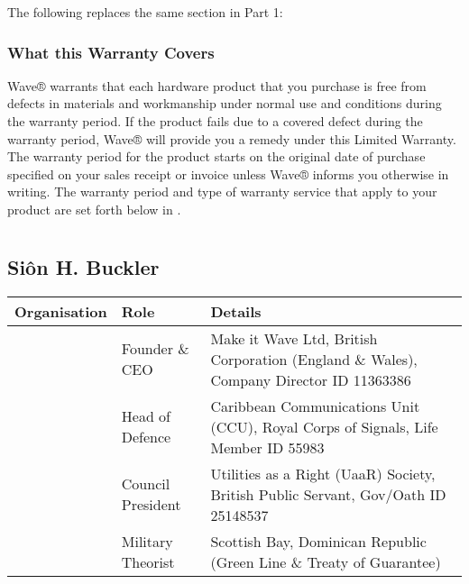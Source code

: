 \documentclass[letterpaper,10pt,openany,oneside,english]{sphinxmanual}
\begin{document}
The following replaces the same section in Part 1:


\subsection{What this Warranty Covers}
\label{\detokenize{part3:what-this-warranty-covers}}
Wave® warrants that each hardware product that you purchase is free from defects in materials and workmanship under normal use and conditions during the warranty period. If the product fails due to a covered defect during the warranty period, Wave® will provide you a remedy under this Limited Warranty. The warranty period for the product starts on the original date of purchase specified on your sales receipt or invoice unless Wave® informs you otherwise in writing. The warranty period and type of warranty service that apply to your product are set forth below in .


\chapter{}
\label{\detokenize{index:document-author-s}}

\section{Siôn H. Buckler}
\label{\detokenize{index:sion-h-buckler}}

\begin{savenotes}\sphinxattablestart
\centering
\begin{tabulary}{\linewidth}[t]{|T|T|T|}
\hline
\sphinxstyletheadfamily 
Organisation
&\sphinxstyletheadfamily 
Role
&\sphinxstyletheadfamily 
Details
\\
\hline
\noindent{}
&
Founder \& CEO
&
Make it Wave Ltd, British Corporation (England \& Wales), Company Director ID 11363386
\\
\hline
\noindent{}
&
Head of Defence
&
Caribbean Communications Unit (CCU), Royal Corps of Signals, Life Member ID 55983
\\
\hline
\noindent{}
&
Council President
&
Utilities as a Right (UaaR) Society, British Public Servant, Gov/Oath ID 25148537
\\
\hline
\noindent{}
&
Military Theorist
&
Scottish Bay, Dominican Republic (Green Line \& Treaty of Guarantee)
\\
\hline
\end{tabulary}
\par
\sphinxattableend\end{savenotes}
\end{document}
